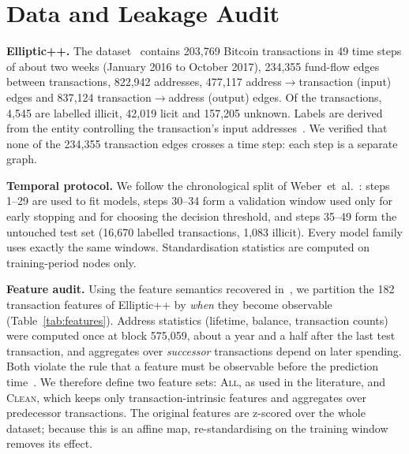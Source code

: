 \section{Data and Leakage Audit}\label{sec:data}

\textbf{Elliptic++.} The dataset~\cite{elmougy2023} contains 203{,}769 Bitcoin
transactions in 49 time steps of about two weeks (January 2016 to October 2017),
234{,}355 fund-flow edges between transactions, 822{,}942 addresses, 477{,}117
address$\rightarrow$transaction (input) edges and 837{,}124
transaction$\rightarrow$address (output) edges. Of the transactions, 4{,}545
are labelled illicit, 42{,}019 licit and 157{,}205 unknown. Labels are derived
from the entity controlling the transaction's input addresses~\cite{weber2019,safar2026}.
We verified that none of the 234{,}355 transaction edges crosses a time step:
each step is a separate graph.

\textbf{Temporal protocol.} We follow the chronological split of
Weber~et~al.~\cite{weber2019}: steps 1--29 are used to fit models, steps 30--34
form a validation window used only for early stopping and for choosing the
decision threshold, and steps 35--49 form the untouched test set (16{,}670
labelled transactions, 1{,}083 illicit). Every model family uses exactly the
same windows. Standardisation statistics are computed on training-period
nodes only.

\textbf{Feature audit.} Using the feature semantics recovered
in~\cite{safar2026}, we partition the 182 transaction features of Elliptic++
by \emph{when} they become observable (Table~\ref{tab:features}). Address
statistics (lifetime, balance, transaction counts) were computed once at block
575{,}059, about a year and a half after the last test transaction, and aggregates
over \emph{successor} transactions depend on later spending. Both violate the
rule that a feature must be observable before the prediction
time~\cite{kaufman2012,kapoor2023}. We therefore define two feature sets:
\textsc{All}, as used in the literature, and \textsc{Clean}, which keeps only
transaction-intrinsic features and aggregates over predecessor transactions.
The original features are z-scored over the whole dataset; because this is an
affine map, re-standardising on the training window removes its effect.

